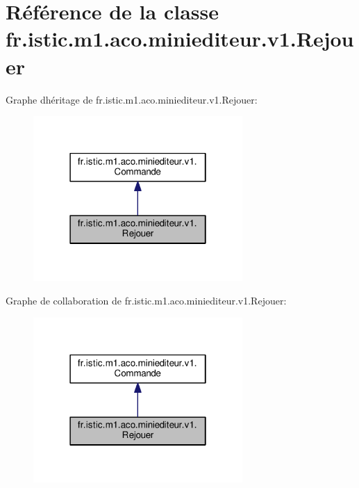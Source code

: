 \hypertarget{classfr_1_1istic_1_1m1_1_1aco_1_1miniediteur_1_1v1_1_1Rejouer}{}\section{Référence de la classe fr.\+istic.\+m1.\+aco.\+miniediteur.\+v1.\+Rejouer}
\label{classfr_1_1istic_1_1m1_1_1aco_1_1miniediteur_1_1v1_1_1Rejouer}


Graphe d\textquotesingle{}héritage de fr.\+istic.\+m1.\+aco.\+miniediteur.\+v1.\+Rejouer\+:
\nopagebreak
\begin{figure}[H]
\begin{center}
\leavevmode
\includegraphics[width=226pt]{classfr_1_1istic_1_1m1_1_1aco_1_1miniediteur_1_1v1_1_1Rejouer__inherit__graph}
\end{center}
\end{figure}


Graphe de collaboration de fr.\+istic.\+m1.\+aco.\+miniediteur.\+v1.\+Rejouer\+:
\nopagebreak
\begin{figure}[H]
\begin{center}
\leavevmode
\includegraphics[width=226pt]{classfr_1_1istic_1_1m1_1_1aco_1_1miniediteur_1_1v1_1_1Rejouer__coll__graph}
\end{center}
\end{figure}
